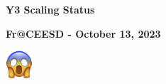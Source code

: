 \documentclass[aspectratio=169]{beamer}
\begin{document}
\begin{frame}\frametitle{}
\vspace*{0.2in}
\centerline{\textrm{{\huge\bfseries\color{myOrange}\mirgecom{} }}}
\smallskip
\centerline{\textrm{{\small\bfseries\color{myOrange}Y3 Scaling Status}}}
\smallskip
\smallskip
\centerline{\textrm{{\large\bfseries{Fr@CEESD - October 13, 2023}}}}
\begin{center}
  \includegraphics[width=1cm]{Figures/scaredscream.png}
\end{center}
\vspace*{0.2in}
\begin{center}
\vspace*{0.4in}
\end{center}
\end{frame}
\end{document}
